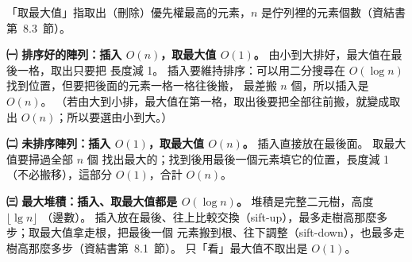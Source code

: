 \begin{pastsoln}
「取最大值」指取出（刪除）優先權最高的元素，$n$ 是佇列裡的元素個數（資結書第~8.3~節）。

\textbf{㈠ 排序好的陣列：插入 $O(n)$，取最大值 $O(1)$。} 由小到大排好，最大值在最後一格，取出只要把
長度減 1。 插入要維持排序：可以用二分搜尋在 $O(\log n)$ 找到位置，但要把後面的元素一格一格往後搬，
最差搬 $n$ 個，所以插入是 $O(n)$。 （若由大到小排，最大值在第一格，取出後要把全部往前搬，就變成取出
$O(n)$；所以要選由小到大。）

\textbf{㈡ 未排序陣列：插入 $O(1)$，取最大值 $O(n)$。} 插入直接放在最後面。 取最大值要掃過全部 $n$ 個
找出最大的；找到後用最後一個元素填它的位置，長度減 1（不必搬移），這部分 $O(1)$，合計 $O(n)$。

\textbf{㈢ 最大堆積：插入、取最大值都是 $O(\log n)$。} 堆積是完整二元樹，高度 $\lfloor \lg n \rfloor$
（邊數）。 插入放在最後、往上比較交換（sift-up），最多走樹高那麼多步；取最大值拿走根，把最後一個
元素搬到根、往下調整（sift-down），也最多走樹高那麼多步（資結書第~8.1~節）。 只「看」最大值不取出是
$O(1)$。


\end{pastsoln}
